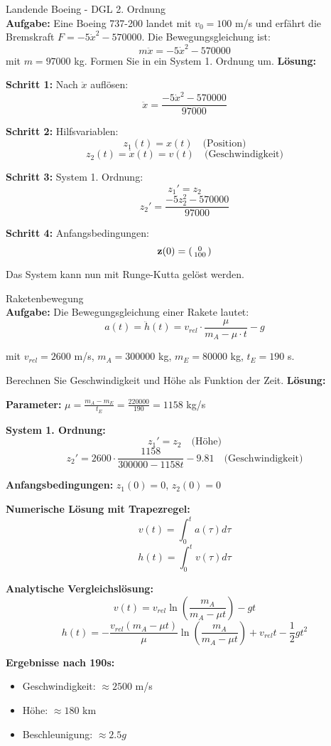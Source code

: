 \begin{example2}{Landende Boeing - DGL 2. Ordnung}\\
\textbf{Aufgabe:} Eine Boeing 737-200 landet mit $v_0 = 100$ m/s und erfährt die Bremskraft $F = -5\dot{x}^2 - 570000$. Die Bewegungsgleichung ist:
$$m\ddot{x} = -5\dot{x}^2 - 570000$$
mit $m = 97000$ kg. Formen Sie in ein System 1. Ordnung um.
\tcblower
\textbf{Lösung:}

\textbf{Schritt 1:} Nach $\ddot{x}$ auflösen:
$$\ddot{x} = \frac{-5\dot{x}^2 - 570000}{97000}$$

\textbf{Schritt 2:} Hilfsvariablen:
$$z_1(t) = x(t) \quad \text{(Position)}$$
$$z_2(t) = \dot{x}(t) = v(t) \quad \text{(Geschwindigkeit)}$$

\textbf{Schritt 3:} System 1. Ordnung:
$$z_1' = z_2$$
$$z_2' = \frac{-5z_2^2 - 570000}{97000}$$

\textbf{Schritt 4:} Anfangsbedingungen:
$$\mathbf{z}(0) = \begin{psmallmatrix} 0 \\ 100 \end{psmallmatrix}$$

Das System kann nun mit Runge-Kutta gelöst werden.
\end{example2}

\begin{example2}{Raketenbewegung}\\
\textbf{Aufgabe:} Die Bewegungsgleichung einer Rakete lautet:
$$a(t) = \ddot{h}(t) = v_{rel} \cdot \frac{\mu}{m_A - \mu \cdot t} - g$$

mit $v_{rel} = 2600$ m/s, $m_A = 300000$ kg, $m_E = 80000$ kg, $t_E = 190$ s.

Berechnen Sie Geschwindigkeit und Höhe als Funktion der Zeit.
\tcblower
\textbf{Lösung:}

\textbf{Parameter:} $\mu = \frac{m_A - m_E}{t_E} = \frac{220000}{190} = 1158$ kg/s

\textbf{System 1. Ordnung:}
$$z_1' = z_2 \quad \text{(Höhe)}$$
$$z_2' = 2600 \cdot \frac{1158}{300000 - 1158t} - 9.81 \quad \text{(Geschwindigkeit)}$$

\textbf{Anfangsbedingungen:} $z_1(0) = 0$, $z_2(0) = 0$

\textbf{Numerische Lösung mit Trapezregel:}
$$v(t) = \int_0^t a(\tau) d\tau$$
$$h(t) = \int_0^t v(\tau) d\tau$$

\textbf{Analytische Vergleichslösung:}
$$v(t) = v_{rel} \ln\left(\frac{m_A}{m_A - \mu t}\right) - gt$$
$$h(t) = -\frac{v_{rel}(m_A - \mu t)}{\mu} \ln\left(\frac{m_A}{m_A - \mu t}\right) + v_{rel} t - \frac{1}{2}gt^2$$

\textbf{Ergebnisse nach 190s:}
\begin{itemize}
    \item Geschwindigkeit: $\approx 2500$ m/s
    \item Höhe: $\approx 180$ km
    \item Beschleunigung: $\approx 2.5g$
\end{itemize}
\end{example2}

